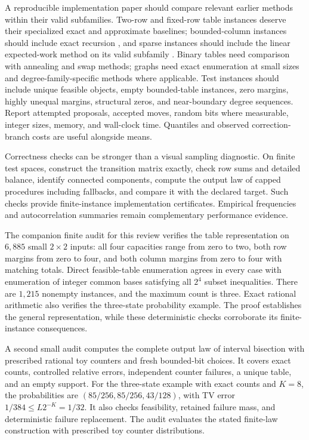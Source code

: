 \documentclass[11pt]{article}
\begin{document}
A reproducible implementation paper should compare relevant earlier methods within their valid subfamilies. Two-row and fixed-row table instances deserve their specialized exact and approximate baselines; bounded-column instances should include exact recursion \cite{MH2013}, and sparse instances should include the linear expected-work method on its valid subfamily \cite{AGW2024}. Binary tables need comparison with annealing and swap methods; graphs need exact enumeration at small sizes and degree-family-specific methods where applicable. Test instances should include unique feasible objects, empty bounded-table instances, zero margins, highly unequal margins, structural zeros, and near-boundary degree sequences. Report attempted proposals, accepted moves, random bits where measurable, integer sizes, memory, and wall-clock time. Quantiles and observed correction-branch costs are useful alongside means.

Correctness checks can be stronger than a visual sampling diagnostic. On finite test spaces, construct the transition matrix exactly, check row sums and detailed balance, identify connected components, compute the output law of capped procedures including fallbacks, and compare it with the declared target. Such checks provide finite-instance implementation certificates. Empirical frequencies and autocorrelation summaries remain complementary performance evidence.

The companion finite audit for this review verifies the table representation on \(6{,}885\) small \(2\times2\) inputs: all four capacities range from zero to two, both row margins from zero to four, and both column margins from zero to four with matching totals. Direct feasible-table enumeration agrees in every case with enumeration of integer common bases satisfying all \(2^4\) subset inequalities. There are \(1{,}215\) nonempty instances, and the maximum count is three. Exact rational arithmetic also verifies the three-state probability example. The proof establishes the general representation, while these deterministic checks corroborate its finite-instance consequences.

A second small audit computes the complete output law of interval bisection with prescribed rational toy counters and fresh bounded-bit choices. It covers exact counts, controlled relative errors, independent counter failures, a unique table, and an empty support. For the three-state example with exact counts and \(K=8\), the probabilities are \((85/256,85/256,43/128)\), with TV error \(1/384\leq L2^{-K}=1/32\). It also checks feasibility, retained failure mass, and deterministic failure replacement. The audit evaluates the stated finite-law construction with prescribed toy counter distributions.
\end{document}
